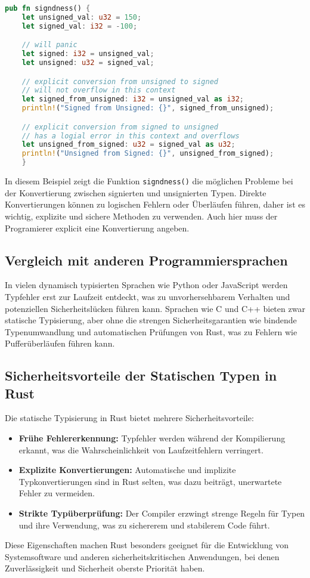 \begin{lstlisting}[language=Rust, caption={Signiertheit}]
pub fn signdness() {
    let unsigned_val: u32 = 150;
    let signed_val: i32 = -100;

    // will panic 
    let signed: i32 = unsigned_val;
    let unsigned: u32 = signed_val;

    // explicit conversion from unsigned to signed
    // will not overflow in this context
    let signed_from_unsigned: i32 = unsigned_val as i32;
    println!("Signed from Unsigned: {}", signed_from_unsigned);

    // explicit conversion from signed to unsigned
    // has a logial error in this context and overflows
    let unsigned_from_signed: u32 = signed_val as u32;
    println!("Unsigned from Signed: {}", unsigned_from_signed); 
    }
\end{lstlisting}
\noindent
In diesem Beispiel zeigt die Funktion \texttt{signdness()} die möglichen Probleme bei der Konvertierung zwischen signierten und unsignierten Typen. 
Direkte Konvertierungen können zu logischen Fehlern oder Überläufen führen, daher ist es wichtig, explizite und sichere Methoden zu verwenden.
Auch hier muss der Programierer explicit eine Konvertierung angeben.

\subsection{Vergleich mit anderen Programmiersprachen}

In vielen dynamisch typisierten Sprachen wie Python oder JavaScript werden Typfehler erst zur Laufzeit entdeckt, was zu unvorhersehbarem Verhalten und potenziellen Sicherheitslücken führen kann. 
Sprachen wie C und C++ bieten zwar statische Typisierung, aber ohne die strengen Sicherheitsgarantien wie bindende Typenumwandlung und automatischen Prüfungen von Rust, was zu Fehlern wie Pufferüberläufen führen kann.

\subsection{Sicherheitsvorteile der Statischen Typen in Rust}

Die statische Typisierung in Rust bietet mehrere Sicherheitsvorteile:
\begin{itemize}
    \item \textbf{Frühe Fehlererkennung:} Typfehler werden während der Kompilierung erkannt, was die Wahrscheinlichkeit von Laufzeitfehlern verringert.
    \item \textbf{Explizite Konvertierungen:} Automatische und implizite Typkonvertierungen sind in Rust selten, was dazu beiträgt, unerwartete Fehler zu vermeiden.
    \item \textbf{Strikte Typüberprüfung:} Der Compiler erzwingt strenge Regeln für Typen und ihre Verwendung, was zu sichererem und stabilerem Code führt.
\end{itemize}
\noindent
Diese Eigenschaften machen Rust besonders geeignet für die Entwicklung von Systemsoftware und anderen sicherheitskritischen Anwendungen, bei denen Zuverlässigkeit und Sicherheit oberste Priorität haben.
